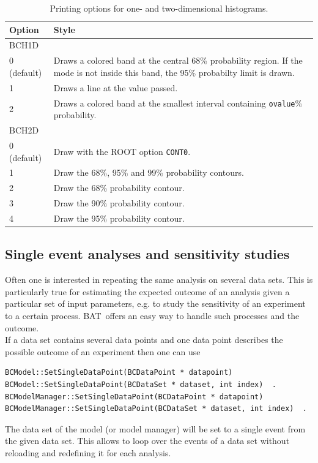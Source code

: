 \documentclass[11pt, a4paper]{article}
\newcommand{\BAT}{{\sc BAT}}
\begin{document}
\begin{table}[ht!]
\begin{tabular}{ll}
\hline
Option & Style \\ 
\hline
BCH1D & \\ 
\hline 
0 (default) & \begin{minipage}[l]{12 cm}Draws a colored band at the central 68\% probability region. If the mode is not inside this band, the 95\% probabilty limit is drawn. \end{minipage}\\ 
1           & Draws a line at the value passed. \\ 
2           & Draws a colored band at the smallest interval containing \verb|ovalue|\% probability. \\
\hline 
BCH2D & \\ 
\hline 
0 (default) & Draw with the ROOT option \verb|CONT0|. \\ 
1           & Draw the 68\%, 95\% and 99\% probability contours. \\ 
2           & Draw the 68\% probability contour. \\ 
3           & Draw the 90\% probability contour. \\ 
4           & Draw the 95\% probability contour. \\ 
\hline
\end{tabular}
\caption{Printing options for one- and two-dimensional histograms. 
\label{table:printingoptions}} 
\end{table}

\pagebreak 


\subsection{Single event analyses and sensitivity studies}
\label{subsection:singleeventanalyses}

Often one is interested in repeating the same analysis on several data
sets. This is particularly true for estimating the expected outcome of
an analysis given a particular set of input parameters, e.g. to study
the sensitivity of an experiment to a certain process. \BAT\ offers an
easy way to handle such processes and the outcome. \\ 

\noindent 
If a data set contains several data points and one data point
describes the possible outcome of an experiment then one can use 
%
\begin{verbatim}
BCModel::SetSingleDataPoint(BCDataPoint * datapoint) 
BCModel::SetSingleDataPoint(BCDataSet * dataset, int index)  . 
BCModelManager::SetSingleDataPoint(BCDataPoint * datapoint) 
BCModelManager::SetSingleDataPoint(BCDataSet * dataset, int index)  . 
\end{verbatim} 
%
The data set of the model (or model manager) will be set to a single
event from the given data set. This allows to loop over the events of
a data set without reloading and redefining it for each analysis. \\ 
\end{document}
